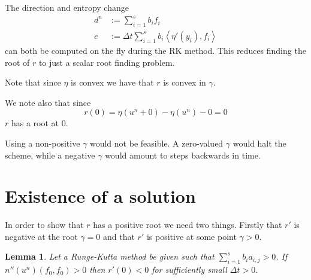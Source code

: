 \documentclass{report}
\newtheorem{lemma}[theorem]{Lemma}
\newcommand{\inner}[2]{\left< #1 , #2 \right>}
\begin{document}
    The direction and entropy change
    \begin{align*}
        d^n &:= \sum^s_{i=1}b_if_i \\
        e   &:= \Delta t \sum^s_{i=1} b_i \inner{\eta'(y_i)}{f_i}
    \end{align*}
    can both be computed on the fly during the RK method. This reduces finding the root of \(r\) to just a scalar root finding problem.

    Note that since \(\eta\) is convex we have that \(r\) is convex in \(\gamma\).

    We note also that since
    \begin{equation}\label{Eq_r_at_0}
        r(0) = \eta (u^{n} + 0) - \eta (u^{n}) - 0 = 0
    \end{equation}
    \(r\) has a root at \(0\).

    Using a non-positive \(\gamma\) would not be feasible. A zero-valued \(\gamma\) would halt the scheme, while a negative \(\gamma\) would amount to steps backwards in time.

%

%


\section{Existence of a solution}
In order to show that \(r\) has a positive root we need two things. Firstly that \(r'\) is negative at the root \(\gamma = 0\) and that \(r'\) is positive at some point \(\gamma > 0\).

    \begin{lemma}
        Let a Runge-Kutta method be given such that \(\sum_{i=1}^{s}b_{i}a_{i,j}>0\). If \(n''(u^n)(f_0,f_0) > 0\) then \(r'(0)<0\) for sufficiently small \(\Delta t > 0\).
    \end{lemma}
\end{document}
